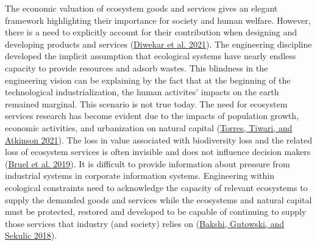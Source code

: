 \documentclass[
]{article}
\begin{document}
The economic valuation of ecosystem goods and services gives an elegant framework highlighting their importance for society and human welfare.
However, there is a need to explicitly account for their contribution when designing and developing products and services (\protect\hyperlink{ref-Diwekar2021}{Diwekar et al. 2021}).
The engineering discipline developed the implicit assumption that ecological systems have nearly endless capacity to provide resources and adsorb wastes.
This blindness in the engineering vision can be explaining by the fact that at the beginning of the technological industrialization, the human activites' impacts on the earth remained marginal. This scenario is not true today.
The need for ecosystem services research has become evident due to the impacts of population growth, economic activities, and urbanization on natural capital (\protect\hyperlink{ref-Torres2021}{Torres, Tiwari, and Atkinson 2021}).
The loss in value associated with biodiversity loss and the related loss of ecosystem services is often invisible and does not influence decision makers (\protect\hyperlink{ref-Bruel2018}{Bruel et al. 2019}).
It is difficult to provide information about pressure from industrial systems in corporate information systems.
Engineering within ecological constraints need to acknowledge the capacity of relevant ecosystems to supply the demanded goods and services while the ecosystems and natural capital must be protected, restored and developed to be capable of continuing to supply those services that industry (and society) relies on (\protect\hyperlink{ref-Bakshi2018}{Bakshi, Gutowski, and Sekulic 2018}).
\end{document}
